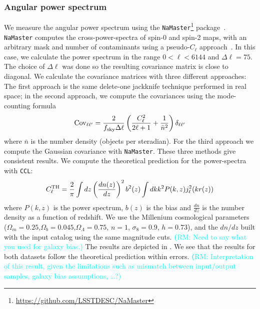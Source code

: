 \documentclass[twocolumn]{aastex62}
\newcommand{\rachel}[1]{{\textcolor{cyan}{{\textbf (RM: #1)}}}}
\begin{document}
\subsubsection{Angular power spectrum}
We measure the angular power spectrum using the \texttt{NaMaster}\footnote{\url{https://github.com/LSSTDESC/NaMaster}} package~\citep{2018arXiv180909603A}. \texttt{NaMaster} computes the cross-power-spectra of spin-0 and spin-2 maps, with an arbitrary mask and number of contaminants using a pseudo-$C_{\ell}$ approach~\citep{2002ApJ...567....2H,2017MNRAS.465.1847E}. In this case, we calculate the power spectrum in the range $0 < \ell < 6144$ and $\Delta \ell = 75$. The choice of $\Delta \ell$ was done so the resulting covariance matrix is close to diagonal. We calculate the covariance matrices with three different approaches: The first approach is the same delete-one jackknife technique performed in real space; in the second approach, we compute the covariances using the mode-counting formula~\citep{Dodelson:1282338,2007MNRAS.381.1347C}
\begin{equation}
\mathrm{Cov}_{\ell\ell'}=\frac{2}{f_{\rm sky}\Delta\ell}\left(\frac{C_{\ell}^{2}}{2\ell+1}+\frac{1}{\bar{n}^{2}}\right)\delta_{\ell\ell'}
\end{equation}
where $\bar{n}$ is the number density (objects per steradian). For the third approach we compute the Gaussian covariance with \texttt{NaMaster}. These three methods give consistent results. We compute the theoretical prediction for the power-spectra with \texttt{CCL}:
\begin{equation}
C_{\ell}^{\rm TH} = \frac{2}{\pi}\int{dz} \left(\frac{dn(z)}{dz}\right)^{2} b^{2}(z) \int{dk k^{2} P(k,z)j^{2}_{\ell}(kr(z))}
\end{equation}
where $P(k,z)$ is the power spectrum, $b(z)$ is the bias and $\frac{dn}{dz}$ is the number density as a function of redshift. We use the Millenium cosmological parameters~\citep{2005Nature.435.629S} ($\Omega_{m}=0.25$,$\Omega_{b}=0.045$,$\Omega_{\Lambda}=0.75$, $n=1$, $\sigma_{8}=0.9$, $h=0.73$), and the $dn/dz$ built with the input catalog using the same magnitude cuts. \rachel{Need to say what you used for galaxy bias.} The results are depicted in . We see that the results for both datasets follow the theoretical prediction within errors. \rachel{Interpretation of this result, given the limitations such as mismatch between input/output samples, galaxy bias assumptions, \dots?}
\end{document}
